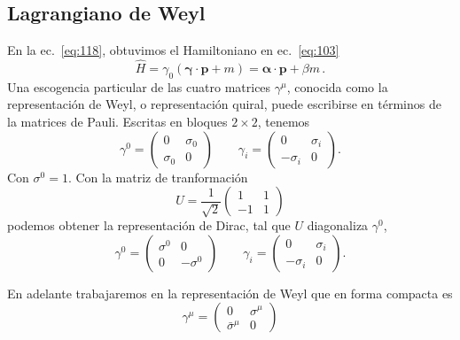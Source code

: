 \subsection{Lagrangiano de Weyl}
\label{sec:lagrangiano-de-weyl}
\begin{borrar}
En la ec.~\eqref{eq:118}, obtuvimos el Hamiltoniano en ec.~\eqref{eq:103}
\begin{equation}
  \hat{H}= \gamma_0(\boldsymbol{\gamma}\cdot\mathbf{p}+m)=\boldsymbol{\alpha}\cdot\mathbf{p}+\beta m\,.
\end{equation}
Una escogencia particular de las cuatro matrices $\gamma^\mu$, conocida como la representaci\'on de Weyl, o representaci\'on quiral, puede escribirse en t\'erminos de la matrices de Pauli. Escritas en bloques $2\times2$, tenemos
\begin{equation}
  \gamma^0=
  \begin{pmatrix}
    0&\sigma_0\\
    \sigma_0&0
  \end{pmatrix}\qquad
  \gamma_i=\begin{pmatrix}
    0&\sigma_i\\
    -\sigma_i&0
  \end{pmatrix}.
\end{equation}
Con $\sigma^0=1$. Con la matriz de tranformaci\'on
\begin{equation}
  U=\frac{1}{\sqrt{2}}
  \begin{pmatrix}
    1&1\\
    -1&1    
  \end{pmatrix}
\end{equation}
podemos obtener la representaci\'on de Dirac, tal que $U$ diagonaliza $\gamma^0$,
\begin{equation}
  \gamma^0=
  \begin{pmatrix}
    \sigma^0&0\\
    0&-\sigma^0
  \end{pmatrix}\qquad
  \gamma_i=\begin{pmatrix}
    0&\sigma_i\\
    -\sigma_i&0
  \end{pmatrix}.
\end{equation}
\end{borrar}
En adelante trabajaremos en la representaci\'on de Weyl que en forma compacta es
\begin{equation}
  \gamma^\mu=\begin{pmatrix}
    0&\sigma^\mu\\
    \bar{\sigma}^\mu & 0
  \end{pmatrix}
\end{equation}
